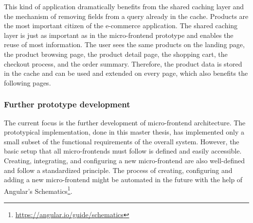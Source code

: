 \bigskip

\noindent This kind of application dramatically benefits from the shared caching layer and the mechanism of removing fields from a query already in the cache. Products are the most important citizen of the e-commerce application. The shared caching layer is just as important as in the micro-frontend prototype and enables the reuse of most information. The user sees the same products on the landing page, the product browsing page, the product detail page, the shopping cart, the checkout process, and the order summary. Therefore, the product data is stored in the cache and can be used and extended on every page, which also benefits the following pages.

\subsubsection{Further prototype development}

The current focus is the further development of micro-frontend architecture. The prototypical implementation, done in this master thesis, has implemented only a small subset of the functional requirements of the overall system. However, the basic setup that all micro-frontends must follow is defined and easily accessible. Creating, integrating, and configuring a new micro-frontend are also well-defined and follow a standardized principle. The process of creating, configuring and adding a new micro-frontend might be automated in the future with the help of Angular's Schematics\footnote{\url{https://angular.io/guide/schematics}}.
